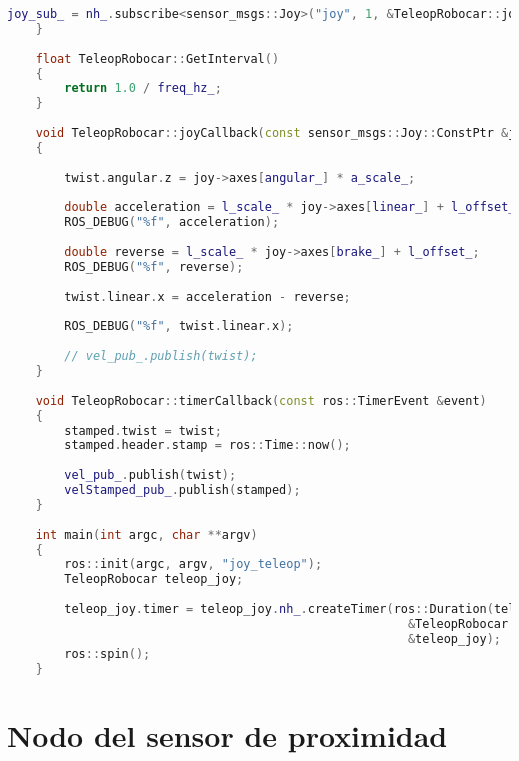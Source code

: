 \begin{lstlisting}[title={joy\_teleop.cpp},language=c++]
        joy_sub_ = nh_.subscribe<sensor_msgs::Joy>("joy", 1, &TeleopRobocar::joyCallback, this);
    }
    
    float TeleopRobocar::GetInterval()
    {
        return 1.0 / freq_hz_;
    }
    
    void TeleopRobocar::joyCallback(const sensor_msgs::Joy::ConstPtr &joy)
    {
    
        twist.angular.z = joy->axes[angular_] * a_scale_;
    
        double acceleration = l_scale_ * joy->axes[linear_] + l_offset_;
        ROS_DEBUG("%f", acceleration);
    
        double reverse = l_scale_ * joy->axes[brake_] + l_offset_;
        ROS_DEBUG("%f", reverse);
    
        twist.linear.x = acceleration - reverse;
    
        ROS_DEBUG("%f", twist.linear.x);
    
        // vel_pub_.publish(twist);
    }
    
    void TeleopRobocar::timerCallback(const ros::TimerEvent &event)
    {
        stamped.twist = twist;
        stamped.header.stamp = ros::Time::now();
    
        vel_pub_.publish(twist);
        velStamped_pub_.publish(stamped);
    }
    
    int main(int argc, char **argv)
    {
        ros::init(argc, argv, "joy_teleop");
        TeleopRobocar teleop_joy;
    
        teleop_joy.timer = teleop_joy.nh_.createTimer(ros::Duration(teleop_joy.GetInterval()),
                                                        &TeleopRobocar::timerCallback,
                                                        &teleop_joy);
        ros::spin();
    }
\end{lstlisting}
\section{Nodo del sensor de proximidad}

